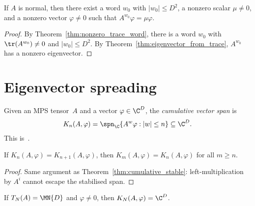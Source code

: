 \begin{theorem}\label{thm:eigenvalue_extraction}
    \leanok
    If $A$ is normal, then there exist a word $w_0$ with
    $|w_0| \le D^2$,
    a nonzero scalar $\mu \neq 0$, and a nonzero vector
    $\varphi \neq 0$ such that $A^{w_0} \varphi = \mu \varphi$.
\end{theorem}

\begin{proof}
    \leanok
    By Theorem~\ref{thm:nonzero_trace_word}, there is a word $w_0$
    with $\tr(A^{w_0}) \neq 0$ and $|w_0| \le D^2$.
    By Theorem~\ref{thm:eigenvector_from_trace},
    $A^{w_0}$ has a nonzero eigenvector.
\end{proof}

\section{Eigenvector spreading}

\begin{definition}\label{def:cumulative_vector_span}
    \leanok
    Given an MPS tensor~$A$ and a vector
    $\varphi \in \C^D$, the \emph{cumulative vector span} is
    \[
        K_n(A, \varphi) =
        \spn_{\C}\{A^w \varphi : |w| \le n\}
        \subseteq  \C^D.
    \]
    This is~\cite[proof of Lemma~2(a)]{Sanz2010Quantum}.
\end{definition}

\begin{theorem}\label{thm:vector_span_stable}
    \leanok
    If $K_n(A, \varphi) = K_{n+1}(A, \varphi)$, then
    $K_m(A, \varphi) = K_n(A, \varphi)$ for all $m \ge n$.
\end{theorem}

\begin{proof}\leanok{}
    Same argument as Theorem~\ref{thm:cumulative_stable}:
    left-multiplication by $A^i$ cannot escape the stabilised span.
\end{proof}

\begin{lemma}\label{lem:vector_span_from_matrix}
    \leanok
    If $T_N(A) = \MN{D}$ and $\varphi \neq 0$, then
    $K_N(A, \varphi) = \C^D$.
\end{lemma}

